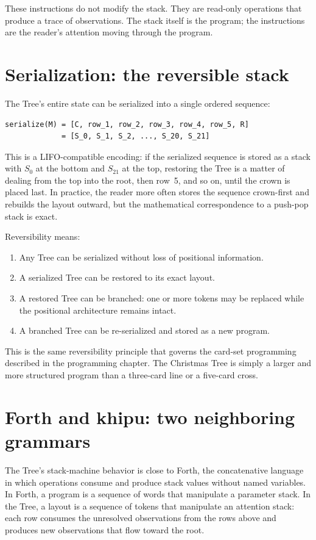 These instructions do not modify the stack. They are read-only operations that
produce a trace of observations. The stack itself is the program; the
instructions are the reader's attention moving through the program.

\section{Serialization: the reversible stack}

The Tree's entire state can be serialized into a single ordered sequence:

\begin{verbatim}
serialize(M) = [C, row_1, row_2, row_3, row_4, row_5, R]
             = [S_0, S_1, S_2, ..., S_20, S_21]
\end{verbatim}

This is a LIFO-compatible encoding: if the serialized sequence is stored as a
stack with $S_0$ at the bottom and $S_{21}$ at the top, restoring the Tree is
a matter of dealing from the top into the root, then row~5, and so on, until
the crown is placed last. In practice, the reader more often stores the
sequence crown-first and rebuilds the layout outward, but the mathematical
correspondence to a push-pop stack is exact.

Reversibility means:

\begin{enumerate}
\item Any Tree can be serialized without loss of positional information.
\item A serialized Tree can be restored to its exact layout.
\item A restored Tree can be branched: one or more tokens may be replaced while
      the positional architecture remains intact.
\item A branched Tree can be re-serialized and stored as a new program.
\end{enumerate}

This is the same reversibility principle that governs the card-set programming
described in the programming chapter. The Christmas Tree is simply a larger
and more structured program than a three-card line or a five-card cross.

\section{Forth and khipu: two neighboring grammars}

The Tree's stack-machine behavior is close to Forth, the concatenative language
in which operations consume and produce stack values without named variables. In
Forth, a program is a sequence of words that manipulate a parameter stack.
In the Tree, a layout is a sequence of tokens that manipulate an attention
stack: each row consumes the unresolved observations from the rows above and
produces new observations that flow toward the root.

